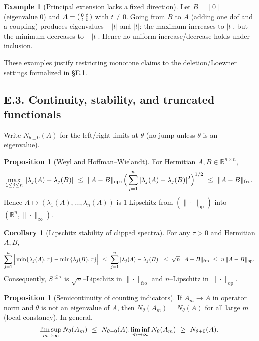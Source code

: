 \documentclass[11pt]{article}
\numberwithin{equation}{section}
\theoremstyle{plain}
\theoremstyle{definition}
\theoremstyle{remark}
\newcommand{\RR}{\mathbb{R}}
\theoremstyle{plain}
\theoremstyle{definition}
\numberwithin{equation}{section}
\newtheorem{proposition}[theorem]{Proposition}
\newtheorem{corollary}[theorem]{Corollary}
\theoremstyle{definition}
\newtheorem{example}[theorem]{Example}
\numberwithin{equation}{section}
\theoremstyle{plain}
\theoremstyle{definition}
\theoremstyle{remark}
\providecommand{\n}{\unskip\space}
\begin{document}
\begin{example}[Principal extension lacks a fixed direction]\label{E:ex:principal-extend}
Let \(B=[0]\) (eigenvalue \(0\)) and
\(A=\begin{psmallmatrix}0 & t\\ t & 0\end{psmallmatrix}\) with \(t\neq 0\).
Going from \(B\) to \(A\) (adding one dof and a coupling) produces eigenvalues \(-|t|\) and \(|t|\):
the maximum increases to \(|t|\), but the minimum decreases to \(-|t|\).
Hence no uniform increase/decrease holds under inclusion.
\end{example}

These examples justify restricting monotone claims to the deletion/Loewner settings formalized in §E.1.

\subsection*{E.3. Continuity, stability, and truncated functionals}

Write \(N_{\theta\pm 0}(A)\) for the left/right limits at \(\theta\) (no jump unless \(\theta\) is an eigenvalue).

\begin{proposition}[Weyl and Hoffman–Wielandt]\label{E:prop:weyl}
For Hermitian \(A,B\in\RR^{n\times n}\),
\[
\max_{1\le j\le n}\,|\lambda_j(A)-\lambda_j(B)|\ \le\ \|A-B\|_{\mathrm{op}},\n\qquad\n\Big(\sum_{j=1}^n |\lambda_j(A)-\lambda_j(B)|^2\Big)^{1/2}\ \le\ \|A-B\|_{\mathrm{fro}}.
\]
Hence \(A\mapsto(\lambda_1(A),\dots,\lambda_n(A))\) is \(1\)-Lipschitz from \((\|\cdot\|_{\mathrm{op}})\) into \((\RR^n,\|\cdot\|_\infty)\).
\end{proposition}

\begin{corollary}[Lipschitz stability of clipped spectra]\label{E:cor:clip}
For any \(\tau>0\) and Hermitian \(A,B\),
\[
\sum_{j=1}^n\Big|\min\{\lambda_j(A),\tau\}-\min\{\lambda_j(B),\tau\}\Big|\n\ \le\ \sum_{j=1}^n|\lambda_j(A)-\lambda_j(B)|\n\ \le\ \sqrt{n}\,\|A-B\|_{\mathrm{fro}}\n\ \le\ n\,\|A-B\|_{\mathrm{op}}.
\]
Consequently, \(S^{\le \tau}\) is \(\sqrt{n}\)–Lipschitz in \(\|\cdot\|_{\mathrm{fro}}\) and \(n\)–Lipschitz in \(\|\cdot\|_{\mathrm{op}}\).
\end{corollary}

\begin{proposition}[Semicontinuity of counting indicators]\label{E:prop:count-semi}
If \(A_m\to A\) in operator norm and \(\theta\) is not an eigenvalue of \(A\), then \(N_\theta(A_m)=N_\theta(A)\) for all large \(m\) (local constancy).
In general,
\[
\limsup_{m\to\infty} N_\theta(A_m)\ \le\ N_{\theta-0}(A),\n\qquad\n\liminf_{m\to\infty} N_\theta(A_m)\ \ge\ N_{\theta+0}(A).
\]
\end{proposition}
\end{document}
